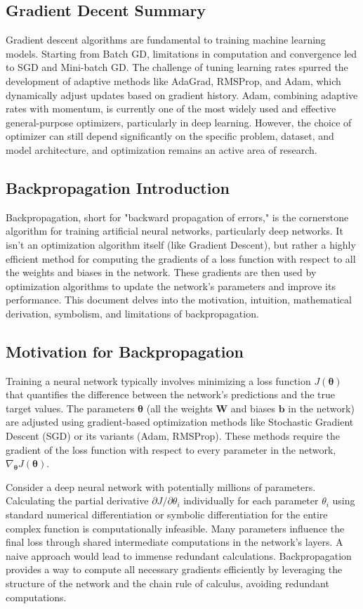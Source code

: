 \documentclass{article}
\newcommand{\btheta}{\bm{\theta}}
\newcommand{\bW}{\bm{W}}
\newcommand{\bb}{\bm{b}}
\begin{document}
\subsection{Gradient Decent Summary}
Gradient descent algorithms are fundamental to training machine learning models. Starting from Batch GD, limitations in computation and convergence led to SGD and Mini-batch GD. The challenge of tuning learning rates spurred the development of adaptive methods like AdaGrad, RMSProp, and Adam, which dynamically adjust updates based on gradient history. Adam, combining adaptive rates with momentum, is currently one of the most widely used and effective general-purpose optimizers, particularly in deep learning. However, the choice of optimizer can still depend significantly on the specific problem, dataset, and model architecture, and optimization remains an active area of research.

\subsection{Backpropagation Introduction}
Backpropagation, short for "backward propagation of errors," is the cornerstone algorithm for training artificial neural networks, particularly deep networks. It isn't an optimization algorithm itself (like Gradient Descent), but rather a highly efficient method for computing the gradients of a loss function with respect to all the weights and biases in the network. These gradients are then used by optimization algorithms to update the network's parameters and improve its performance. This document delves into the motivation, intuition, mathematical derivation, symbolism, and limitations of backpropagation.

\subsection{Motivation for Backpropagation}
Training a neural network typically involves minimizing a loss function $J(\btheta)$ that quantifies the difference between the network's predictions and the true target values. The parameters $\btheta$ (all the weights $\bW$ and biases $\bb$ in the network) are adjusted using gradient-based optimization methods like Stochastic Gradient Descent (SGD) or its variants (Adam, RMSProp). These methods require the gradient of the loss function with respect to every parameter in the network, $\nabla_{\btheta} J(\btheta)$.

Consider a deep neural network with potentially millions of parameters. Calculating the partial derivative $\partial J / \partial \theta_i$ individually for each parameter $\theta_i$ using standard numerical differentiation or symbolic differentiation for the entire complex function is computationally infeasible. Many parameters influence the final loss through shared intermediate computations in the network's layers. A naive approach would lead to immense redundant calculations. Backpropagation provides a way to compute all necessary gradients efficiently by leveraging the structure of the network and the chain rule of calculus, avoiding redundant computations.
\end{document}
